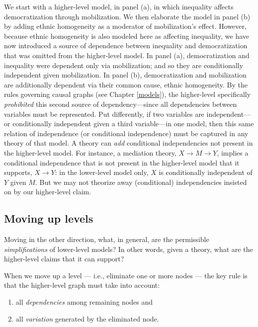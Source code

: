 \documentclass[12pt,]{book}
\providecommand{\tightlist}{%
  \setlength{\itemsep}{0pt}\setlength{\parskip}{0pt}}
\begin{document}
We start with a higher-level model, in panel (a), in which inequality affects democratization through mobilization. We then elaborate the model in panel (b) by adding ethnic homogeneity as a moderator of mobilization's effect. However, because ethnic homogeneity is also modeled here as affecting inequality, we have now introduced a source of dependence between inequality and democratization that was omitted from the higher-level model. In panel (a), democratization and inequality were dependent only via mobilization; and so they are conditionally independent given mobilization. In panel (b), democratization and mobilization are additionally dependent via their common cause, ethnic homogeneity. By the rules governing causal graphs (see Chapter \ref{models}), the higher-level specifically \emph{prohibited} this second source of dependency---since all dependencies between variables must be represented.
Put differently, if two variables are independent--- or conditionally independent given a third variable---in one model, then this same relation of independence (or conditional independence) must be captured in any theory of that model. A theory can \emph{add} conditional independencies not present in the higher-level model. For instance, a mediation theory, \(X \rightarrow M \rightarrow Y\), implies a conditional independence that is not present in the higher-level model that it supports, \(X \rightarrow Y\): in the lower-level model only, \(X\) is conditionally independent of \(Y\) given \(M\). But we may not theorize away (conditional) independencies insisted on by our higher-level claim.

\hypertarget{moving-up-levels}{%
\subsection{Moving up levels}\label{moving-up-levels}}

Moving in the other direction, what, in general, are the permissible \emph{simplifications} of lower-level models? In other words, given a theory, what are the higher-level claims that it can support?

When we move up a level --- i.e., eliminate one or more nodes --- the key rule is that the higher-level graph must take into account:

\begin{enumerate}
\def\labelenumi{(\alph{enumi})}
\tightlist
\item
  all \emph{dependencies} among remaining nodes and
\item
  all \emph{variation} generated by the eliminated node.
\end{enumerate}
\end{document}
